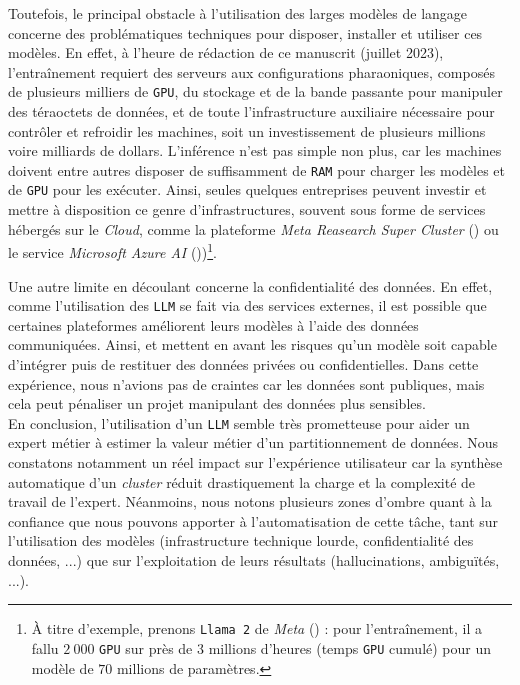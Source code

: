 			Toutefois, le principal obstacle à l'utilisation des larges modèles de langage concerne des problématiques techniques pour disposer, installer et utiliser ces modèles.
			En effet, à l'heure de rédaction de ce manuscrit (juillet 2023), l'entraînement requiert des serveurs aux configurations pharaoniques, composés de plusieurs milliers de \texttt{GPU}, du stockage et de la bande passante pour manipuler des téraoctets de données, et de toute l'infrastructure auxiliaire nécessaire pour contrôler et refroidir les machines, soit un investissement de plusieurs millions voire milliards de dollars.
			L'inférence n'est pas simple non plus, car les machines doivent entre autres disposer de suffisamment de \texttt{RAM} pour charger les modèles et de \texttt{GPU} pour les exécuter.
			Ainsi, seules quelques entreprises peuvent investir et mettre à disposition ce genre d'infrastructures, souvent sous forme de services hébergés sur le \textit{Cloud}, comme la plateforme \textit{Meta Reasearch Super Cluster} (\cite{lee-sengupta:2022:introducing-ai-research}) ou le service \textit{Microsoft Azure AI} (\cite{roach:2023:how-microsoft-bet}))\footnote{
				À titre d'exemple, prenons \texttt{Llama 2} de \textit{Meta} (\cite{touvron-etal:2023:llama-open-foundation}) : pour l'entraînement, il a fallu $2~000$ \texttt{GPU} sur près de $3$ millions d'heures (temps \texttt{GPU} cumulé) pour un modèle de $70$ millions de paramètres.
			}.
			
			Une autre limite en découlant concerne la confidentialité des données.
			En effet, comme l'utilisation des \texttt{LLM} se fait via des services externes, il est possible que certaines plateformes améliorent leurs modèles à l'aide des données communiquées.
			Ainsi, \cite{huang-etal:2022:are-large-pretrained} et \cite{oneill-connor:2023:amplifying-limitations-harms} mettent en avant les risques qu'un modèle soit capable d'intégrer puis de restituer des données privées ou confidentielles.
			Dans cette expérience, nous n'avions pas de craintes car les données sont publiques, mais cela peut pénaliser un projet manipulant des données plus sensibles.
			\\
			
			En conclusion, l'utilisation d'un \texttt{LLM} semble très prometteuse pour aider un expert métier à estimer la valeur métier d'un partitionnement de données.
			Nous constatons notamment un réel impact sur l'expérience utilisateur car la synthèse automatique d'un \textit{cluster} réduit drastiquement la charge et la complexité de travail de l'expert.
			Néanmoins, nous notons plusieurs zones d'ombre quant à la confiance que nous pouvons apporter à l'automatisation de cette tâche, tant sur l'utilisation des modèles (infrastructure technique lourde, confidentialité des données, ...) que sur l'exploitation de leurs résultats (hallucinations, ambiguïtés, ...).
		
